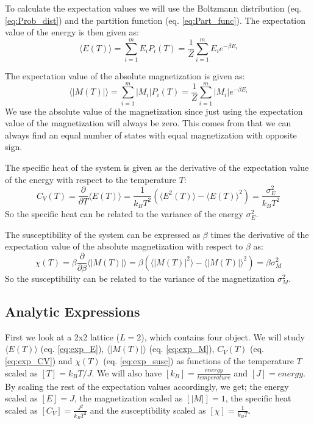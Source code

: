 \documentclass[12pt,a4paper,english]{article}
\begin{document}
 To calculate the expectation values we will use the Boltzmann distribution (eq. \ref{eq:Prob_dist}) and the partition function (eq. \ref{eq:Part_func}).  The expectation value of the energy is then given as:
\begin{equation}
\label{eq:exp_E}
\langle E(T)\rangle=\sum_{i=1}^{m}E_iP_i(T)=\frac{1}{Z}\sum_{i=1}^{m}E_ie^{-\beta E_i}
\end{equation}

The expectation value of the absolute magnetization is given as:
\begin{equation}
\label{eq:exp_M}
\langle |M(T)|\rangle=\sum_{i=1}^{m}|M_i|P_i(T)=\frac{1}{Z}\sum_{i=1}^{m}|M_i|e^{-\beta E_i}
\end{equation}
We use the absolute value of the magnetization since just using the expectation value of the magnetization will always be zero. This comes from that we can always find an equal number of states with equal magnetization with opposite sign. 

The specific heat of the system is given as the derivative of the expectation value of the energy with respect to the temperature $T$:
\begin{equation}
\label{eq:exp_CV}
C_V(T)=\frac{\partial}{\partial T}\langle E(T)\rangle=\frac{1}{k_BT^2}\left(\langle E^2(T)\rangle-\langle E(T)\rangle^2\right)=\frac{\sigma_E^2}{k_BT^2}
\end{equation}
So the specific heat can be related to the variance of the energy $\sigma_E^2$.

The susceptibility of the system can be expressed as $\beta$ times the derivative of the expectation value of the absolute magnetization with respect to $\beta$ as:
\begin{equation}
\label{eq:exp_susc}
\chi(T)=\beta\frac{\partial}{\partial \beta}\langle |M(T)|\rangle=\beta\left(\langle |M(T)|^2\rangle-\langle |M(T)|\rangle^2\right)=\beta \sigma_M^2
\end{equation}
So the susceptibility can be related to the variance of the magnetization $\sigma_M^2$.

\subsection{Analytic Expressions}
\label{subsect:analytic}
First we look at a 2x2 lattice ($L=2$), which contains four object. We will study $\langle E(T)\rangle$ (eq. \ref{eq:exp_E}), $\langle |M(T)|\rangle$ (eq. \ref{eq:exp_M}), $C_V(T)$ (eq. \ref{eq:exp_CV}) and $\chi(T)$ (eq. \ref{eq:exp_susc}) as functions of the temperature $T$ scaled as $[T]=k_BT/J$. We will also have $[k_B]=\frac{energy}{temperature}$ and $[J]=energy$. By scaling the rest of the expectation values accordingly, we get; the energy scaled as $[E]=J$, the magnetization scaled as $[|M|]=1$, the specific heat scaled as $[C_V]=\frac{J^2}{k_BT^2}$ and the susceptibility scaled as $[\chi]=\frac{1}{k_BT}$.
\end{document}
